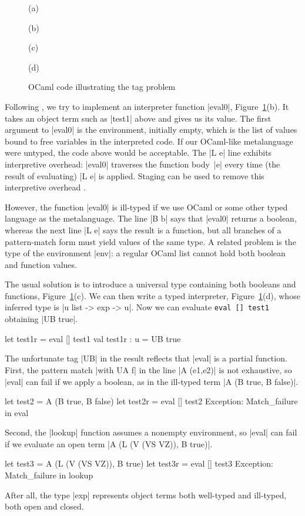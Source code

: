 \begin{figure}
%
(a) 

\smallskip
(b) 

\smallskip
(c) 

\smallskip
(d) 

\medskip
\caption{OCaml code illustrating the tag problem}
\label{fig:tag-problem}
\end{figure}

\fi
Following \citet{WalidICFP02},
we try to implement an interpreter function |eval0|\ifshort,
Figure~\ref{fig:tag-problem}(b)\fi. It takes
an object term such as |test1| above and gives us its value.
The first argument to |eval0| is the environment, initially empty,
which is the list of values bound to free variables in the
interpreted code.
\ifshort\else{}\fi
If our OCaml-like metalanguage were untyped, the code above would be 
acceptable.
The |L e| line exhibits interpretive overhead:
|eval0| traverses the function body~|e| every time (the result of
evaluating) |L e| is applied. Staging can be used to remove this
interpretive overhead \citep[\S1.1--2]{WalidICFP02}.

However, the function |eval0| is ill-typed
if we use OCaml or some other typed language as the metalanguage.
The line |B b|
says that |eval0| returns a boolean, whereas the next line |L e| says
the result is a function, but all branches of a pattern-match form must
yield values of the same type. 
A related problem is the type of the environment |env|: a regular
OCaml list cannot hold both boolean and function values. 

The usual solution is to introduce a universal type \citep[\S1.3]
{WalidICFP02} containing both booleans and functions\ifshort,
Figure~\ref{fig:tag-problem}(c)\fi.
\ifshort\else{}\fi
We can then write a typed interpreter\ifshort,
Figure~\ref{fig:tag-problem}(d), \else{}\fi
whose inferred type is |u list -> exp -> u|. Now we can evaluate
\ifshort
\texttt{eval [] test1} obtaining |UB true|.
\else
\begin{code}
let test1r = eval [] test1
val test1r : u = UB true 
\end{code}
\fi
The unfortunate tag |UB| in the result reflects that |eval| is a partial
function.  
First, the pattern match |with UA f| in the line
|A (e1,e2)| is not exhaustive, so |eval| can fail if we apply a boolean,
as in the ill-typed term |A (B true, B false)|.
\ifshort\else
\begin{code}
let test2 = A (B true, B false)
let test2r = eval [] test2
Exception: Match_failure in eval
\end{code}
\fi
Second, the |lookup|
function assumes a nonempty environment, so |eval| can fail if we
evaluate an open term
\ifshort
|A (L (V (VS VZ)), B true)|.
\else
\begin{code}
let test3 = A (L (V (VS VZ)), B true)
let test3r = eval [] test3
Exception: Match_failure in lookup
\end{code}
\fi
After all, the type |exp| represents object
terms both well-typed and ill-typed, both open and closed.

